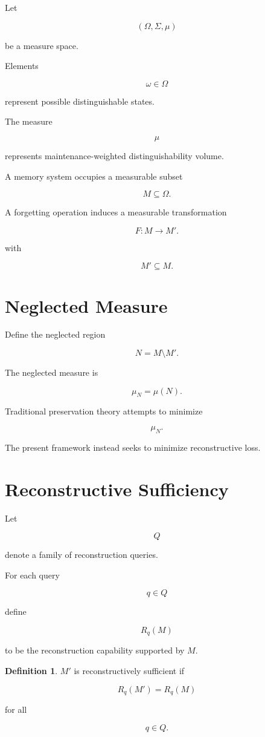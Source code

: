 \documentclass[12pt,oneside]{book}
\theoremstyle{plain} \newtheorem{theorem}{Theorem}[chapter] \newtheorem{lemma}[theorem]{Lemma} \newtheorem{proposition}[theorem]{Proposition} \newtheorem{corollary}[theorem]{Corollary}
\theoremstyle{definition} \newtheorem{definition}[theorem]{Definition} \newtheorem{axiom}[theorem]{Axiom} \newtheorem{construction}[theorem]{Construction}
\theoremstyle{remark} \newtheorem{remark}[theorem]{Remark} \newtheorem{example}[theorem]{Example}
\begin{document}
Let

\[
(\Omega,\Sigma,\mu)
\]

be a measure space.

Elements

\[
\omega\in\Omega
\]

represent possible distinguishable states.

The measure

\[
\mu
\]

represents maintenance-weighted distinguishability volume.

A memory system occupies a measurable subset

\[
M\subseteq \Omega.
\]

A forgetting operation induces a measurable transformation

\[
F:M\rightarrow M'.
\]

with

\[
M'\subseteq M.
\]

\section{Neglected Measure}

Define the neglected region

\[
N=M\setminus M'.
\]

The neglected measure is

\[
\mu_N
=
\mu(N).
\]

Traditional preservation theory attempts to minimize

\[
\mu_N.
\]

The present framework instead seeks to minimize reconstructive loss.

\section{Reconstructive Sufficiency}

Let

\[
Q
\]

denote a family of reconstruction queries.

For each query

\[
q\in Q
\]

define

\[
R_q(M)
\]

to be the reconstruction capability supported by $M$.

\begin{definition}

$M'$ is reconstructively sufficient if

\[
R_q(M')
=
R_q(M)
\]

for all

\[
q\in Q.
\]

\end{definition}
\end{document}
